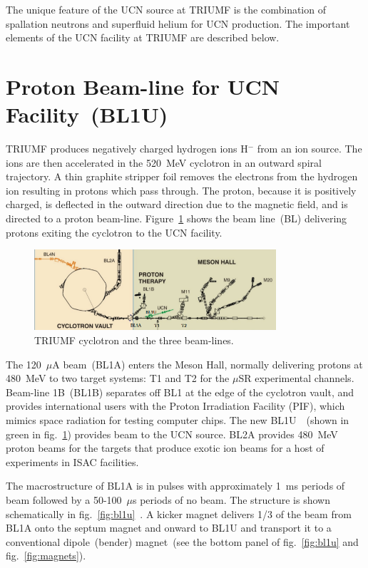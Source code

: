 The unique feature of the UCN source at TRIUMF is the combination of
spallation neutrons and superfluid helium for UCN production. The
important elements of the UCN facility at TRIUMF are described below.


\section{Proton Beam-line for UCN Facility~(BL1U)\label{sec:bl1u}}
TRIUMF produces negatively charged hydrogen ions H$^-$ from an ion
source. The ions are then accelerated in the 520~MeV cyclotron in an
outward spiral trajectory. A thin graphite stripper foil removes the
electrons from the hydrogen ion resulting in protons which pass
through. The proton, because it is positively charged, is deflected in
the outward direction due to the magnetic field, and is directed to a
proton beam-line.
Figure~\ref{fig:cyclotron} shows the beam line~(BL) delivering protons
exiting the cyclotron to the UCN facility.

\begin{figure}[h!]
  \centering
  \includegraphics[width=0.8\textwidth]{cyclotron.png}
  \caption{TRIUMF cyclotron and the three beam-lines.}
  \label{fig:cyclotron}
\end{figure}


The 120~$\mu$A beam~(BL1A) enters the Meson Hall, normally delivering
protons at 480~MeV to two target systems: T1 and T2 for the $\mu$SR
experimental channels. Beam-line 1B~(BL1B) separates off BL1 at the
edge of the cyclotron vault, and provides international users with the
Proton Irradiation Facility (PIF), which mimics space radiation for
testing computer chips. The new BL1U~\cite{beamline}~(shown in green
in fig.~\ref{fig:cyclotron}) provides beam to the UCN source. BL2A
provides 480~MeV proton beams for the targets that produce exotic ion
beams for a host of experiments in ISAC facilities.


The macrostructure of BL1A is in pulses with approximately 1~ms
periods of beam followed by a 50-100~$\mu$s periods of no beam. The
structure is shown schematically in
fig.~\ref{fig:bl1u}~\cite{Nick_thesis}. A kicker magnet delivers 1/3
of the beam from BL1A onto the septum magnet and onward to BL1U and
transport it to a conventional dipole~(bender) magnet~(see the bottom
panel of fig.~\ref{fig:bl1u} and fig.~\ref{fig:magnets}).


